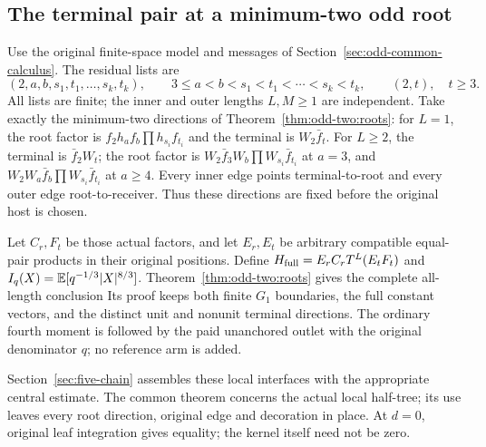 \subsection{The terminal pair at a minimum-two odd root}
\label{proof:Q5-C192}
Use the original finite-space model and messages of
Section~\ref{sec:odd-common-calculus}. The residual lists are
\[
 (2,a,b,s_1,t_1,\ldots,s_k,t_k),\qquad
 3\le a<b<s_1<t_1<\cdots<s_k<t_k,\qquad (2,t),\quad t\ge3.
\]
All lists are finite; the inner and outer lengths \(L,M\ge1\) are
independent. Take exactly the minimum-two directions of
Theorem~\ref{thm:odd-two:roots}: for \(L=1\), the root factor is
\(f_2h_af_b\prod h_{s_i}f_{t_i}\) and the terminal is
\(W_2\bar f_t\). For \(L\ge2\), the terminal is \(\bar f_2W_t\);
the root factor is \(W_2\bar f_3W_b\prod W_{s_i}\bar f_{t_i}\)
at \(a=3\), and \(W_2W_a\bar f_b\prod W_{s_i}\bar f_{t_i}\)
at \(a\ge4\). Every inner edge points terminal-to-root and every
outer edge root-to-receiver. Thus these directions are fixed before
the original host is chosen.

Let \(C_r,F_t\) be those actual factors, and let \(E_r,E_t\)
be arbitrary compatible equal-pair products in their original positions.
Define \(H_{\rm full}=E_rC_rT^L(E_tF_t)\) and
\(I_q(X)=\mathbb E[q^{-1/3}|X|^{8/3}]\). Theorem~\ref{thm:odd-two:roots}
gives the complete all-length conclusion
Its proof keeps both finite \(G_1\) boundaries, the full constant
vectors, and the distinct unit and nonunit terminal directions.
The ordinary fourth moment is followed by the paid unanchored outlet
with the original denominator \(q\); no reference arm is added.

Section~\ref{sec:five-chain} assembles these local interfaces with
the appropriate central estimate. The common theorem concerns the
actual local half-tree; its use leaves every root direction, original edge and decoration in place.
At \(d=0\), original leaf integration gives equality; the kernel
itself need not be zero.
